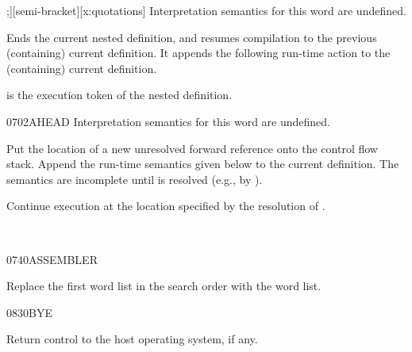 \pagebreak
\begin{worddef}{}{;]}[semi-bracket][x:quotations]
\interpret
	Interpretation semantics for this word are undefined.

\compile

	Ends the current nested definition, and resumes compilation to the
	previous (containing) current definition. It appends the following
	run-time action to the (containing) current definition.

\runtime
	
	 is the execution token of the nested definition.

	\walso{tools:[:}
	\ralso{tools:[:}

	\begin{implement}
		\textdf{See \iref{tools:[:}{}.}
	\end{implement}
\end{worddef}


\begin{worddef}{0702}{AHEAD}
\interpret
	Interpretation semantics for this word are undefined.

\compile

	Put the location of a new unresolved forward reference
	 onto the control flow stack. Append the run-time
	semantics given below to the current definition. The semantics
	are incomplete until  is resolved (e.g., by
	).

\runtime
	\stack{}{}

	Continue execution at the location specified by the resolution
	of .

	\begin{testing} %
		 \\
	\end{testing}
\end{worddef}


\begin{worddef}{0740}{ASSEMBLER}
\item \stack{}{}

	Replace the first word list in the search order with the
	 word list.

\end{worddef}


\begin{worddef}{0830}{BYE}
\item \stack{}{}

	Return control to the host operating system, if any.
\end{worddef}

